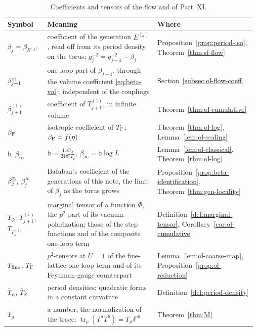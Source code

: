 \begin{table}[htbp]
\centering\small
\renewcommand{\arraystretch}{1.2}
\begin{tabular}{@{}p{}p{}p{}@{}}
\hline
\raggedright Symbol & \raggedright Meaning & \raggedright Where \tabularnewline
\hline
\raggedright $\beta_j=\beta_{E^{(j)}}$ & \raggedright coefficient of the generation $E^{(j)}$, read off from its period density on the torus; $g_j^{-2}=g_{j-1}^{-2}-\beta_j$ & \raggedright Proposition~\ref{prop:period-iso}, Theorem~\ref{thm:sf-flow} \tabularnewline
\raggedright $\beta^{\rm ol}_{j+1}$ & \raggedright one-loop part of $\beta_{j+1}$, through the volume coefficient \eqref{eq:beta-vol}; independent of the couplings & \raggedright Section~\ref{subsec:ol-flow-coeff} \tabularnewline
\raggedright $\beta^{(1)}_{j+1}$ & \raggedright coefficient of $T^{(1)}_{j+1}$, in infinite volume & \raggedright Theorem~\ref{thm:ol-cumulative} \tabularnewline
\raggedright $\beta_{\rm F}$ & \raggedright isotropic coefficient of $T_{\rm F}$; $\beta_{\rm F}=f(\eta)$ & \raggedright Theorem~\ref{thm:ol-log}, Lemma~\ref{lem:ol-scaling} \tabularnewline
\raggedright $\mathsf b$, $\beta_\infty$ & \raggedright $\mathsf b=\frac{11C_A}{24\pi^2T_\rho}$, $\beta_\infty=\mathsf b\log L$ & \raggedright Lemma~\ref{lem:ol-classical}, Theorem~\ref{thm:ol-log} \tabularnewline
\raggedright $\beta^{\rm B}_j$, $\beta^\infty_j$ & \raggedright Ba\l aban's coefficient of the generations of this note, the limit of $\beta_j$ as the torus grows & \raggedright Proposition~\ref{prop:beta-identification}, Theorem~\ref{thm:gen-locality} \tabularnewline
\raggedright $T_\Phi$; $T^{(1)}_{j+1}$, $T_{\Gamma^{(1)}_k}$ & \raggedright marginal tensor of a function $\Phi$, the $p^2$-part of its vacuum polarization; those of the step functions and of the composite one-loop term & \raggedright Definition~\ref{def:marginal-tensor}, Corollary~\ref{cor:ol-cumulative} \tabularnewline
\raggedright $T_{\rm fine}$, $T_{\rm F}$ & \raggedright $p^2$-tensors at $U=1$ of the fine-lattice one-loop term and of its Feynman-gauge counterpart & \raggedright Lemma~\ref{lem:ol-coarse-map}, Proposition~\ref{prop:ol-reduction} \tabularnewline
\raggedright $\bar T_E$, $\bar T_S$ & \raggedright period densities: quadratic forms in a constant curvature & \raggedright Definition~\ref{def:period-density} \tabularnewline
\raggedright $T_\rho$ & \raggedright a number, the normalization of the trace: $\operatorname{tr}_\rho(T^aT^b)=T_\rho\delta^{ab}$ & \raggedright Theorem~\ref{thm:M} \tabularnewline
\hline
\end{tabular}
\caption{Coefficients and tensors of the flow and of Part~XI.}\label{tab:G-betas}
\end{table}

